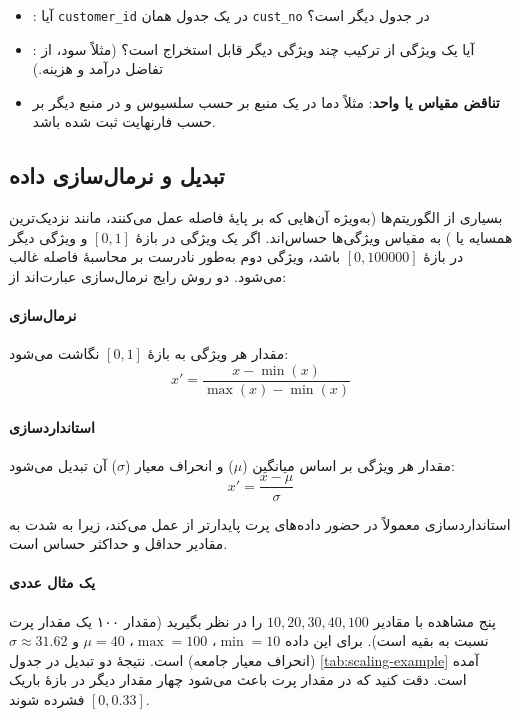 \begin{itemize}
    \item {}: آیا
          \texttt{customer\_id} در یک جدول همان \texttt{cust\_no} در جدول
          دیگر است؟
    \item {}: آیا یک ویژگی از ترکیب چند ویژگی
          دیگر قابل استخراج است؟ (مثلاً سود، از تفاضل درآمد و هزینه.)
    \item \textbf{تناقض مقیاس یا واحد}: مثلاً دما در یک منبع بر حسب سلسیوس و
          در منبع دیگر بر حسب فارنهایت ثبت شده باشد.
\end{itemize}

\subsection{تبدیل و نرمال‌سازی داده}

بسیاری از الگوریتم‌ها (به‌ویژه آن‌هایی که بر پایهٔ فاصله عمل می‌کنند، مانند
نزدیک‌ترین همسایه یا ) به مقیاس ویژگی‌ها حساس‌اند. اگر یک ویژگی در
بازهٔ $[0, 1]$ و ویژگی دیگر در بازهٔ $[0, 100000]$ باشد، ویژگی دوم به‌طور
نادرست بر محاسبهٔ فاصله غالب می‌شود. دو روش رایج نرمال‌سازی عبارت‌اند از:

\paragraph{نرمال‌سازی }
مقدار هر ویژگی به بازهٔ $[0, 1]$ نگاشت می‌شود:
\[
x' = \frac{x - \min(x)}{\max(x) - \min(x)}
\]

\paragraph{استانداردسازی }
مقدار هر ویژگی بر اساس میانگین ($\mu$) و انحراف معیار ($\sigma$) آن
تبدیل می‌شود:
\[
x' = \frac{x - \mu}{\sigma}
\]

استانداردسازی  معمولاً در حضور داده‌های پرت پایدارتر از
 عمل می‌کند، زیرا  به شدت به مقادیر حداقل و حداکثر
حساس است.

\paragraph{یک مثال عددی}
پنج مشاهده با مقادیر $10, 20, 30, 40, 100$ را در نظر بگیرید (مقدار ۱۰۰ یک
مقدار پرت نسبت به بقیه است). برای این داده $\min = 10$، $\max = 100$،
$\mu = 40$ و $\sigma \approx 31.62$ (انحراف معیار جامعه) است. نتیجهٔ دو
تبدیل در جدول \ref{tab:scaling-example} آمده است. دقت کنید که در 
مقدار پرت باعث می‌شود چهار مقدار دیگر در بازهٔ باریک $[0, 0.33]$ فشرده شوند.

